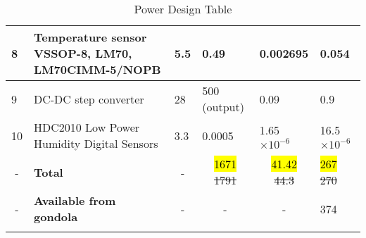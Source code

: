 \begin{longtable}{|m{}| m{} |m{} |m{}|m{}| m{} |}
8                       & Temperature sensor VSSOP-8, LM70, LM70CIMM-5/NOPB & 5.5                                         & 0.49                                         & 0.002695                                  & 0.054                                      \\ \hline
9                       & DC-DC step converter                              & 28                                          & 500 (output)                                 & 0.09                                      & 0.9                                        \\ \hline
10                      & HDC2010 Low Power Humidity Digital Sensors        & 3.3                                         & 0.0005                                       & 1.65$\times10^{-6}$                              & 16.5$\times10^{-6}$                               \\ \hline
\multicolumn{1}{|c|}{-} & \textbf{Total}                                  & \multicolumn{1}{c|}{-}                      & \multicolumn{1}{c|}{\hl{1671} \st{1791}}                    & \multicolumn{1}{c|}{\hl{41.42} \st{44.3}}                 & \hl{267} \st{270}                                        \\ \hline
\multicolumn{1}{|c|}{-} & \textbf{Available from gondola}                 & \multicolumn{1}{c|}{-}                      & \multicolumn{1}{c|}{-}                       & \multicolumn{1}{c|}{-}                    & 374                                        \\ \hline

\caption{Power Design Table}
\label{tab:power-design-table}
\end{longtable}
\raggedbottom

